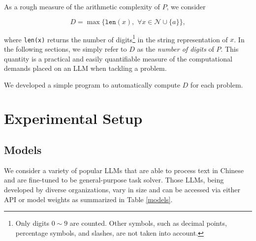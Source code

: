 As a rough measure of the arithmetic complexity of $P$, we consider

\begin{equation}
D = \max\{\texttt{len}(x),\,\,\forall x\in\mathcal{N}\cup\{a\}\},
\end{equation}

where \texttt{len(x)} returns the number of digits\footnote{Only digits $0\sim9$ are counted. Other symbols, such as decimal points, percentage symbols, and slashes, are not taken into account.} in the string representation of $x$. In the following sections, we simply refer to $D$ as the \emph{number of digits} of $P$. This quantity is a practical and easily quantifiable measure of the computational demands placed on an LLM when tackling a problem.

We developed a simple program to automatically compute $D$ for each problem.

\section{Experimental Setup}

\subsection{Models}
We consider a variety of popular LLMs that are able to process text in Chinese and are fine-tuned to be general-purpose task solver. Those LLMs, being developed by diverse organizations, vary in size and can be accessed via either API or model weights as summarized in Table \ref{models}.

